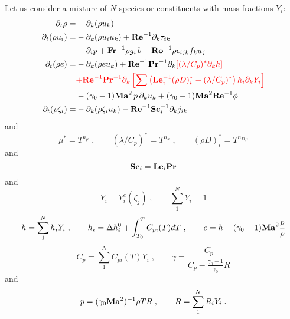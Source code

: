 Let us consider a mixture of $N$ species or constituents with mass fractions $Y_i$:
\begin{subequations}
    \begin{align}
        \partial_t \rho       =& -\partial_k (\rho u_k)                                                \\
        \partial_t (\rho u_i) =& -\partial_k (\rho u_i u_k )+\mathrm{\bf Re}^{-1}\partial_k \tau_{ik}  \nonumber\\
        & -\partial_i p +\mathrm{\bf Fr}^{-1} \rho g_i\,b +\mathrm{\bf Ro}^{-1}\rho\epsilon_{ijk} f_ku_j                                     \\
        \partial_t (\rho e)   =& -\partial_k (\rho e u_k )+\mathrm{\bf Re}^{-1}\mathrm{\bf Pr}^{-1}\partial_k\color{red}{\left[(\lambda/C_p)^{*}\partial_kh\right]}\nonumber\\
        & \color{red}{+\mathrm{\bf Re}^{-1}\mathrm{\bf Pr}^{-1} \partial_k\left[\sum\left(\mathrm{\bf Le}_i^{-1}(\rho D)_i^*
        -(\lambda/C_p)^*\right)h_i \partial_k  Y_i\right]}                                  \nonumber\\
        & -(\gamma_0-1)\mathrm{\bf Ma}^2\,p\, \partial_k u_k  + (\gamma_0-1)\mathrm{\bf Ma}^2\mathrm{\bf Re}^{-1}\phi                 \\
        \partial_t (\rho \zeta_i)=& -\partial_k (\rho \zeta_i u_k) -\mathrm{\bf Re}^{-1}\mathrm{\bf Sc}_i^{-1} \partial_k j_{ik}
    \end{align}
\end{subequations}
and
\begin{equation}
    \mu^{*} = T^{n_\mu}\;,\qquad (\lambda/C_p)^{*} = T^{n_\kappa} \;,\qquad (\rho
    D)_i^{*} = T^{n_{D,i}}
\end{equation}
and
\begin{equation}
    \mathrm{\bf Sc}_i = \mathrm{\bf Le}_i \mathrm{\bf Pr}
\end{equation}
and
\begin{equation}
    Y_i = Y^e_i(\zeta_j)\;, \qquad \sum^N_1 Y_i=1
\end{equation}
\begin{equation}
    h = \sum^N_1 h_{i} Y_i \;,\qquad h_{i} = \Delta h^0_i + \int^{T}_{T_0}
    C_{pi}(T) dT\;,\qquad e = h - (\gamma_0-1)\mathrm{\bf Ma}^2\frac{p}{\rho}
\end{equation}
\begin{equation}
    C_p = \sum^N_1 C_{pi}(T) Y_i\;,\qquad
    \gamma = \frac{C_p}{C_p-\frac{\gamma_0-1}{\gamma_0}R}
\end{equation}
and
\begin{equation}
    p = (\gamma_0 \mathrm{\bf Ma}^2)^{-1}\rho T R \;,\qquad
    R =\sum^N_1 R_iY_i\;.
\end{equation}
